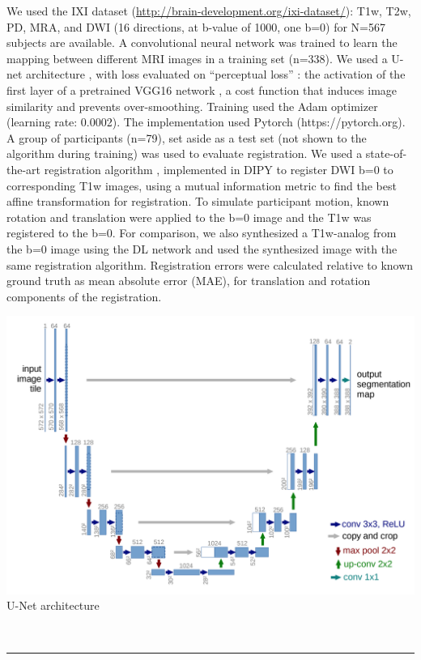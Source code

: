 \documentclass[a0, landscape]{a0poster}
\begin{document}
\begin{multicols}{3}
We used the IXI dataset (\url{http://brain-development.org/ixi-dataset/}): T1w, T2w, PD, MRA, and DWI (16 directions, at b-value of 1000, one b=0) for N=567 subjects are available. A convolutional neural network was trained to learn the mapping between different MRI images in a training set (n=338).  We used a U-net architecture \cite{Ronneberger2015-ua}, with loss evaluated on “perceptual loss” \cite{Johnson2016-ac}: the activation of the first layer of a pretrained VGG16 network \cite{Simonyan2014-ua}, a  cost function that induces image similarity and prevents over-smoothing. Training used the Adam optimizer (learning rate: 0.0002). The implementation used Pytorch (https://pytorch.org).
A group of participants (n=79), set aside as a test set (not shown to the algorithm during training) was used to evaluate registration. We used a state-of-the-art registration algorithm \cite{Avants2008-sa}, implemented in DIPY \cite{Garyfallidis2014-el} to register DWI b=0 to corresponding T1w images, using a mutual information metric to find the best affine transformation for registration. To simulate participant motion, known rotation and translation were applied to the b=0 image and the T1w was registered to the b=0. For comparison, we also synthesized a T1w-analog from the b=0 image using the DL network and used the synthesized image with the same registration algorithm. Registration errors were calculated relative to known ground truth as mean absolute error (MAE), for translation and rotation components of the registration.

\begin{minipage}[b]{0.5\linewidth}
\includegraphics[width=15cm]{unet.png}
\center U-Net architecture
\end{minipage}
\\
\rule{\linewidth}{0.4pt}


\end{multicols}
\end{document}
